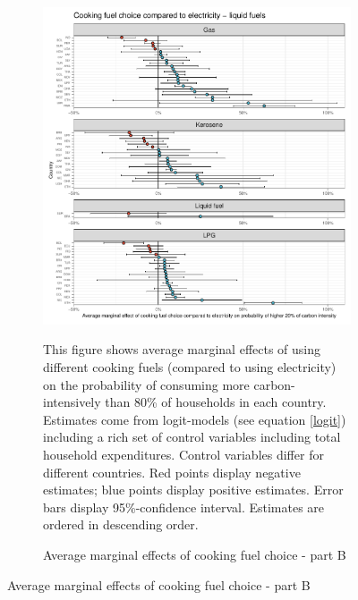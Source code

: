  \begin{figure}[ht!]\ContinuedFloat
   \centering
   \begin{subfigure}[b]{\textwidth}
   \centering
   \caption{Average marginal effects of cooking fuel choice - part B} \label{fig:Logit_ME_CF_2}
   \includegraphics{1_Figures/Analysis_Logit_Models_Marginal_Effects/Average_Marginal_Effects_affected_upper_80_CF_Electricity B_2017B.pdf}
   \begin{subcaption2}
     This figure shows average marginal effects of using different cooking fuels (compared to using electricity) on the probability of consuming more carbon-intensively than 80\% of households in each country. Estimates come from logit-models (see equation \ref{logit}) including a rich set of control variables including total household expenditures. Control variables differ for different countries. Red points display negative estimates; blue points display positive estimates. Error bars display 95\%-confidence interval. Estimates are ordered in descending order.
   \end{subcaption2}
   \end{subfigure}
 \end{figure}
 \clearpage

